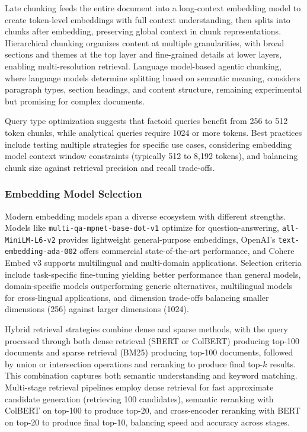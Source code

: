 Late chunking feeds the entire document into a long-context embedding model to create token-level embeddings with full context understanding, then splits into chunks after embedding, preserving global context in chunk representations. Hierarchical chunking organizes content at multiple granularities, with broad sections and themes at the top layer and fine-grained details at lower layers, enabling multi-resolution retrieval. Language model-based agentic chunking, where language models determine splitting based on semantic meaning, considers paragraph types, section headings, and content structure, remaining experimental but promising for complex documents.

Query type optimization suggests that factoid queries benefit from 256 to 512 token chunks, while analytical queries require 1024 or more tokens. Best practices include testing multiple strategies for specific use cases, considering embedding model context window constraints (typically 512 to 8,192 tokens), and balancing chunk size against retrieval precision and recall trade-offs.

\subsubsection{Embedding Model Selection}

Modern embedding models span a diverse ecosystem with different strengths. Models like {\tt multi-qa-mpnet-base-dot-v1} optimize for question-answering, {\tt all-MiniLM-L6-v2} provides lightweight general-purpose embeddings, OpenAI's {\tt text-embedding-ada-002} offers commercial state-of-the-art performance, and Cohere Embed v3 supports multilingual and multi-domain applications. Selection criteria include task-specific fine-tuning yielding better performance than general models, domain-specific models outperforming generic alternatives, multilingual models for cross-lingual applications, and dimension trade-offs balancing smaller dimensions (256) against larger dimensions (1024).

Hybrid retrieval strategies combine dense and sparse methods, with the query processed through both dense retrieval (SBERT or ColBERT) producing top-100 documents and sparse retrieval (BM25) producing top-100 documents, followed by union or intersection operations and reranking to produce final top-$k$ results. This combination captures both semantic understanding and keyword matching. Multi-stage retrieval pipelines employ dense retrieval for fast approximate candidate generation (retrieving 100 candidates), semantic reranking with ColBERT on top-100 to produce top-20, and cross-encoder reranking with BERT on top-20 to produce final top-10, balancing speed and accuracy across stages.

